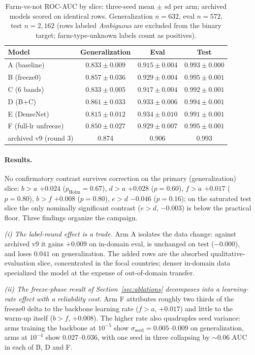 \documentclass[11pt,a4paper]{article}
\begin{document}
\begin{table}[t]
\centering
\small
\caption{Farm-vs-not ROC-AUC by slice: three-seed mean $\pm$ sd per arm;
archived models scored on identical rows. Generalization $n{=}632$, eval
$n{=}572$, test $n{=}2{,}162$ (rows labeled \emph{Ambiguous} are excluded from
the binary target; farm-type-unknown labels count as positives).}
\label{tab:r4results}
\begin{tabular}{lccc}
\toprule
Model & Generalization & Eval & Test \\
\midrule
A (baseline) & $0.833 \pm 0.009$ & $0.915 \pm 0.004$ & $0.993 \pm 0.000$ \\
B (freeze0) & $0.857 \pm 0.036$ & $0.929 \pm 0.004$ & $0.995 \pm 0.001$ \\
C (6 bands) & $0.833 \pm 0.005$ & $0.917 \pm 0.004$ & $0.992 \pm 0.001$ \\
D (B$+$C) & $0.861 \pm 0.033$ & $0.933 \pm 0.006$ & $0.994 \pm 0.001$ \\
E (DenseNet) & $0.815 \pm 0.012$ & $0.934 \pm 0.010$ & $0.991 \pm 0.001$ \\
F (full-lr unfreeze) & $0.850 \pm 0.027$ & $0.929 \pm 0.007$ & $0.995 \pm 0.001$ \\
\midrule
archived v9 (round 3) & 0.874 & 0.906 & 0.993 \\
\bottomrule
\end{tabular}
\end{table}

\paragraph{Results.} No confirmatory contrast survives correction on the
primary (generalization) slice: $b{>}a$ $+0.024$ ($p_{\text{Holm}}=0.67$),
$d{>}a$ $+0.028$ ($p=0.60$), $f{>}a$ $+0.017$ ($p=0.80$), $b{>}f$ $+0.008$
($p=0.80$), $e{>}d$ $-0.046$ ($p=0.16$); on the saturated test slice the only
nominally significant contrast ($e{>}d$, $-0.003$) is below the practical
floor. Three findings organize the campaign.

\emph{(i) The label-round effect is a trade.} Arm A isolates the data change:
against archived v9 it gains $+0.009$ on in-domain eval, is unchanged on test
($-0.000$), and loses $0.041$ on generalization. The added rows are the
absorbed qualitative-evaluation slice, concentrated in the focal countries;
denser in-domain data specialized the model at the expense of out-of-domain
transfer.

\emph{(ii) The freeze-phase result of Section~\ref{sec:ablations} decomposes
into a learning-rate effect with a reliability cost.} Arm F attributes
roughly two thirds of the freeze0 delta to the backbone learning rate
($f{>}a$, $+0.017$) and little to the warm-up itself ($b{>}f$, $+0.008$).
The higher rate also quadruples seed variance: arms training the backbone at
$10^{-5}$ show $\sigma_{\text{seed}} = 0.005$--$0.009$ on generalization,
arms at $10^{-4}$ show $0.027$--$0.036$, with one seed in three collapsing by
$\sim$0.06 AUC in each of B, D and F.
\end{document}

